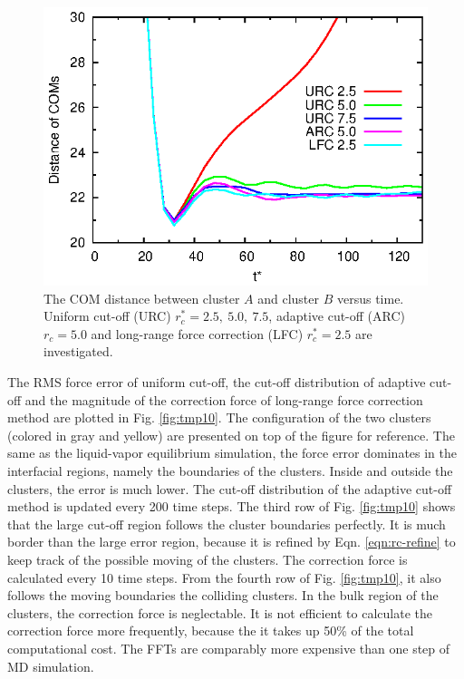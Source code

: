 \documentclass[aps,pre,preprint]{revtex4-1}
\begin{document}
\begin{figure}
  \centering
  \includegraphics[]{fig/dists.eps}
  \caption{The COM distance between cluster $A$ and cluster $B$ versus
    time. Uniform cut-off (URC) $r_c^\ast = 2.5,\ 5.0,\ 7.5$, adaptive
    cut-off (ARC) $r_c = 5.0$ and long-range force correction (LFC)
    $r^\ast_c = 2.5$ are investigated.  }
  \label{fig:tmp9}
\end{figure}


The RMS force error of uniform cut-off, the cut-off
distribution of adaptive cut-off and the magnitude of
the correction force of long-range force correction method
are plotted in Fig. \ref{fig:tmp10}.  The configuration of the two
clusters (colored in gray and yellow) are presented on top of the
figure for reference. The same as the liquid-vapor equilibrium
simulation, the force error dominates in the interfacial regions,
namely the boundaries of the clusters. Inside and outside the
clusters, the error is much lower. The cut-off distribution of the
adaptive cut-off method is updated every 200 time steps. The third row
of Fig. \ref{fig:tmp10} shows that the large cut-off region follows the cluster
boundaries perfectly. It is much border than the
large error region, because it is refined by Eqn. \eqref{eqn:rc-refine}
to keep track of the
possible moving of the clusters.  The correction force is calculated
every 10 time steps. From the fourth row 
of Fig. \ref{fig:tmp10}, it also follows the moving boundaries the colliding
clusters. In the bulk region of the clusters, the correction force is
neglectable. It is not efficient to calculate the correction force more
frequently, because the it takes up 50\% of the
total computational cost. 
The FFTs are comparably more expensive than one step of MD simulation. 
\end{document}
